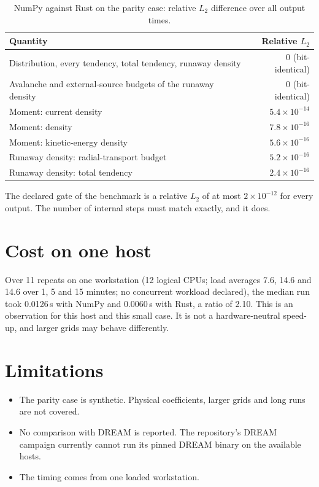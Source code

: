 \documentclass[11pt]{article}
\begin{document}
\begin{table}[ht]
\centering
\caption{NumPy against Rust on the parity case: relative $L_2$ difference over
all output times.}
\label{tab:parity}
\small
\begin{tabular}{lr}
\toprule
Quantity & Relative $L_2$ \\
\midrule
Distribution, every tendency, total tendency, runaway density & 0 (bit-identical) \\
Avalanche and external-source budgets of the runaway density & 0 (bit-identical) \\
Moment: current density & $5.4 \times 10^{-14}$ \\
Moment: density & $7.8 \times 10^{-16}$ \\
Moment: kinetic-energy density & $5.6 \times 10^{-16}$ \\
Runaway density: radial-transport budget & $5.2 \times 10^{-16}$ \\
Runaway density: total tendency & $2.4 \times 10^{-16}$ \\
\bottomrule
\end{tabular}
\end{table}

The declared gate of the benchmark is a relative $L_2$ of at most $2 \times
10^{-12}$ for every output.  The number of internal steps must match
exactly, and it does.

\section{Cost on one host}

Over 11 repeats on one workstation (12 logical CPUs; load averages 7.6, 14.6
and 14.6 over 1, 5 and 15 minutes; no concurrent workload declared), the
median run took 0.0126\,s with NumPy and 0.0060\,s with Rust, a ratio of
2.10.  This is an observation for this host and this small case.  It is not a
hardware-neutral speed-up, and larger grids may behave differently.

\section{Limitations}

\begin{itemize}
\item The parity case is synthetic.  Physical coefficients, larger grids and
long runs are not covered.
\item No comparison with DREAM is reported.  The repository's DREAM campaign
currently cannot run its pinned DREAM binary on the available hosts.
\item The timing comes from one loaded workstation.
\end{itemize}
\end{document}
